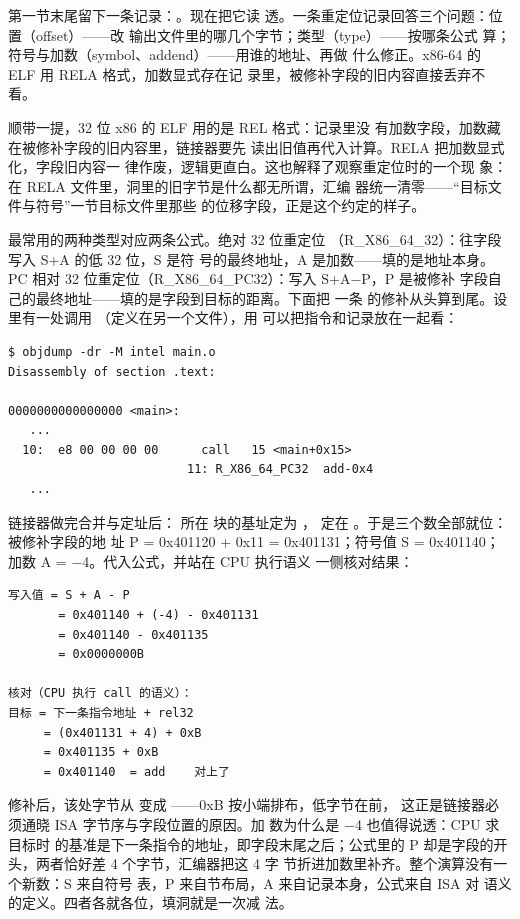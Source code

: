 第一节末尾留下一条记录：。现在把它读
透。一条重定位记录回答三个问题：位置（offset）——改
输出文件里的哪几个字节；类型（type）——按哪条公式
算；符号与加数（symbol、addend）——用谁的地址、再做
什么修正。x86-64 的 ELF 用 RELA 格式，加数显式存在记
录里，被修补字段的旧内容直接丢弃不看。

顺带一提，32 位 x86 的 ELF 用的是 REL 格式：记录里没
有加数字段，加数藏在被修补字段的旧内容里，链接器要先
读出旧值再代入计算。RELA 把加数显式化，字段旧内容一
律作废，逻辑更直白。这也解释了观察重定位时的一个现
象：在 RELA 文件里，洞里的旧字节是什么都无所谓，汇编
器统一清零——“目标文件与符号”一节目标文件里那些
 的位移字段，正是这个约定的样子。

最常用的两种类型对应两条公式。绝对 32 位重定位
（R\_X86\_64\_32）：往字段写入 S+A 的低 32 位，S 是符
号的最终地址，A 是加数——填的是地址本身。PC 相对 32
位重定位（R\_X86\_64\_PC32）：写入 S+A−P，P 是被修补
字段自己的最终地址——填的是字段到目标的距离。下面把
一条  的修补从头算到尾。设 
里有一处调用 （定义在另一个文件），用
 可以把指令和记录放在一起看：

\begin{lstlisting}
$ objdump -dr -M intel main.o
Disassembly of section .text:

0000000000000000 <main>:
   ...
  10:  e8 00 00 00 00      call   15 <main+0x15>
                         11: R_X86_64_PC32  add-0x4
   ...
\end{lstlisting}

链接器做完合并与定址后： 所在 
块的基址定为 ， 定在
。于是三个数全部就位：被修补字段的地
址 P = 0x401120 + 0x11 = 0x401131；符号值 S =
0x401140；加数 A = −4。代入公式，并站在 CPU 执行语义
一侧核对结果：

\begin{lstlisting}
写入值 = S + A - P
       = 0x401140 + (-4) - 0x401131
       = 0x401140 - 0x401135
       = 0x0000000B

核对（CPU 执行 call 的语义）：
目标 = 下一条指令地址 + rel32
     = (0x401131 + 4) + 0xB
     = 0x401135 + 0xB
     = 0x401140  = add    对上了
\end{lstlisting}

修补后，该处字节从  变成
——0xB 按小端排布，低字节在前，
这正是链接器必须通晓 ISA 字节序与字段位置的原因。加
数为什么是 −4 也值得说透：CPU 求  目标时
的基准是下一条指令的地址，即字段末尾之后；公式里的 P
却是字段的开头，两者恰好差 4 个字节，汇编器把这 4 字
节折进加数里补齐。整个演算没有一个新数：S 来自符号
表，P 来自节布局，A 来自记录本身，公式来自 ISA 对
 语义的定义。四者各就各位，填洞就是一次减
法。

